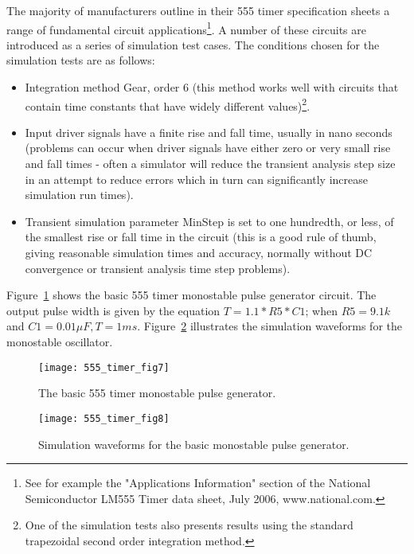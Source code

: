 
The majority of manufacturers outline in their 555 timer specification sheets a range of fundamental circuit applications\footnote{See for example the "Applications Information" section of the National Semiconductor LM555 Timer data sheet, July 2006, www.national.com.}. A number of these circuits are introduced as a series of simulation test cases. The conditions chosen for the simulation tests are as follows:
\begin{itemize}
\item Integration method Gear, order 6 (this method works well with circuits that contain time constants that have widely different values)\footnote{One of the simulation tests also presents results using the standard trapezoidal second order integration method.}.
\item Input driver signals have a finite rise and fall time, usually in nano seconds (problems can occur when driver signals have either zero or very small rise and fall times - often a simulator will reduce the transient analysis step size in an attempt to reduce errors which in turn can significantly increase simulation run times).
\item Transient simulation parameter MinStep is set to one hundredth, or less, of the smallest rise or fall time in the circuit
(this is a good rule of thumb, giving reasonable simulation times and accuracy, normally without DC convergence or transient analysis time step problems).
\end{itemize}


Figure~\ref{fig:555_timer_fig7} shows the basic 555 timer monostable pulse generator circuit. The output pulse width is given by the equation $T=1.1*R5*C1 $; when $ R5 = 9.1k$ and $C1 = 0.01\mu F, T = 1ms$. Figure~\ref{fig:555_timer_fig8} illustrates the simulation waveforms for the monostable oscillator.

\FloatBarrier
\begin{figure}[ht]
  \centering
  \texttt{[image: 555\_timer\_fig7]}
  \caption{The basic 555 timer monostable pulse generator.}
  \label{fig:555_timer_fig7} 
\end{figure} 
\FloatBarrier
 
\FloatBarrier
\begin{figure}[ht]
  \centering
  \texttt{[image: 555\_timer\_fig8]}
  \caption{Simulation waveforms for the basic monostable pulse generator.}
  \label{fig:555_timer_fig8}  
\end{figure} 
\FloatBarrier

